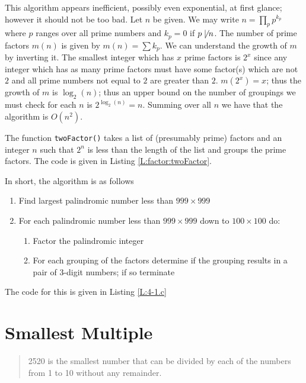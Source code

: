 \documentclass[oneside,12pt]{book}   	%
\newcounter{ex}
\newcounter{pr}
\theoremstyle{definition}
\begin{document}
\begin{spacing}{1.618}
				This algorithm appears inefficient, possibly even exponential, at first glance; however it should not be too bad. Let $n$ be given. We may write $n=\prod_p p^{k_p}$ where $p$ ranges over all prime numbers and $k_p=0$ if $p\not\mid n$. The number of prime factors $m(n)$ is given by $m(n)=\sum k_p$. We can understand the growth of $m$ by inverting it. The smallest integer which has $x$ prime factors is $2^x$ since any integer which has as many prime factors must have some factor(s) which are not $2$ and all prime numbers not equal to $2$ are greater than $2$. $m\left(2^x\right)=x$; thus the growth of $m$ is $\log_2(n)$; thus an upper bound on the number of groupings we must check for each $n$ is $2^{\log_2(n)}=n$. Summing over all $n$ we have that the algorithm is $O\left(n^2\right)$. 
				
				The function \texttt{twoFactor()} takes a list of (presumably prime) factors and an integer $n$ such that $2^n$ is less than the length of the list and groups the prime factors. The code is given in Listing \ref{L:factor:twoFactor}. 

				In short, the algorithm is as follows
				\begin{enumerate}
					\item	Find largest palindromic number less than $999\times 999$
					\item	For each palindromic number less than $999\times 999$ down to $100\times 100$ do:
						\begin{enumerate}
							\item Factor the palindromic integer
							\item For each grouping of the factors determine if the grouping results in a pair of $3$-digit numbers; if so terminate 
						\end{enumerate}
				\end{enumerate}
				The code for this is given in Listing \ref{L:4-1.c}
				\begin{spacing}{1}
				
				\end{spacing}
				
	\chapter{Smallest Multiple}
	
		\begin{quote}
			2520 is the smallest number that can be divided by each of the numbers from 1 to 10 without any remainder.


\end{quote}
\end{spacing}
\end{document}
